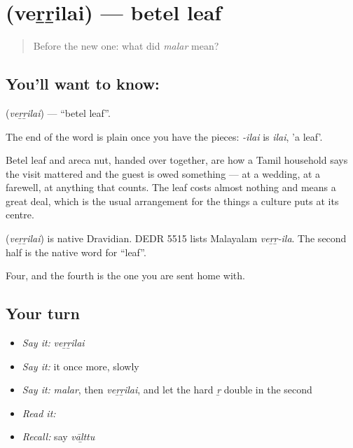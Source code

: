 \section[\texorpdfstring{\ta{வெற்றிலை} (veṟṟilai)}{வெற்றிலை (veṟṟilai)}]{ (veṟṟilai) — betel leaf}

\label{lesson:TA-C50-betel-leaf}



\begin{quote}
Before the new one: what did \emph{malar} mean?
\end{quote}

\subsection*{You'll want to know: }
\textbf{} (\emph{veṟṟilai}) — \textquotedblleft{}betel leaf\textquotedblright{}.

The end of the word is plain once you have the pieces: \emph{-ilai} is \emph{ilai}, 'a leaf'.

Betel leaf and areca nut, handed over together, are how a Tamil household says the visit mattered and the guest is owed something — at a wedding, at a farewell, at anything that counts. The leaf costs almost nothing and means a great deal, which is the usual arrangement for the things a culture puts at its centre.

\begin{cousinweb}
\textbf{} (\emph{veṟṟilai}) is native Dravidian. DEDR 5515 lists Malayalam \emph{veṟṟ-ila}. The second half is the native word for \textquotedblleft{}leaf\textquotedblright{}.
\end{cousinweb}

\begin{grammarlens}[title={What you've built}]
Four, and the fourth is the one you are sent home with.
\end{grammarlens}

\subsection*{Your turn}
\begin{itemize}
\raggedright
  \item \emph{Say it:} \emph{veṟṟilai}
  \item \emph{Say it:} it once more, slowly
  \item \emph{Say it:} \emph{malar}, then \emph{veṟṟilai}, and let the hard \emph{ṟ} double in the second
  \item \emph{Read it:} \textbf{}
  \item \emph{Recall:} say \emph{vāḻttu}
\end{itemize}

